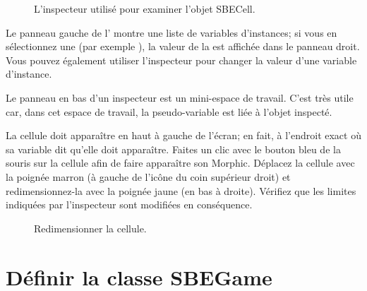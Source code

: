 \documentclass[a4paper,10pt,twoside]{book}
\begin{document}

\begin{figure}[htbp]
   \centering
   \caption{L'inspecteur utilisé pour examiner l'objet SBECell.\label{fig:SBECellInspector}}
\end{figure}

Le panneau gauche de l' montre une liste de variables d'instances; si vous en sélectionnez une (par exemple \mbox{),} la valeur de la  est affichée dans le panneau droit. Vous pouvez également utiliser l'inspecteur pour changer la valeur d'une variable d'instance.


Le panneau en bas d'un inspecteur est un mini-espace de travail. C'est très utile car, dans cet espace de travail, la pseudo-variable \self est liée à l'objet inspecté.

La cellule doit apparaître en haut à gauche de l'écran; en fait, à l'endroit exact o\`u sa variable  dit qu'elle doit apparaître.
Faites un clic avec le bouton bleu de la souris sur la cellule afin de faire apparaître son  Morphic.
Déplacez la cellule avec la poignée marron (à 
gauche de l'ic\^one du coin supérieur droit) et redimensionnez-la avec la poignée jaune (en bas à droite).
Vérifiez que les limites indiquées par l'inspecteur sont modifiées en conséquence.

\begin{figure}[htbp]
\centering
\caption{Redimensionner la cellule.\label{fig:cellresize}}
\end{figure}


\section{Définir la classe SBEGame}
\end{document}
